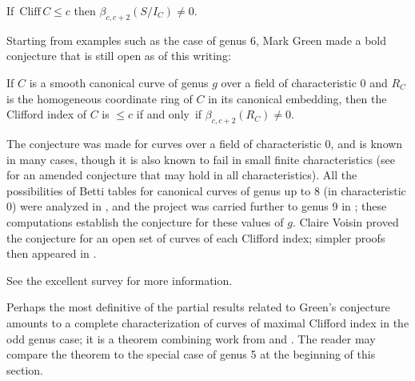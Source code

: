 \begin{corollary}
If\, $\mathrm{Cliff}\, C \leq c$ then $\beta_{c,c+2}(S/I_C) \neq 0$.
\unif
\end{corollary}

Starting from examples such as the case of genus 6, Mark Green made a
%
bold conjecture that is still open as of this writing:

\begin{conjecture}
If $C$ is a smooth canonical curve of genus $g$ over a field of 
characteristic 0
 and $R_{C}$ is the
%
homogeneous coordinate ring of $C$ in its canonical embedding,
then the Clifford index of $C$ is $\leq c$ if and only~if
$\beta_{c,c+2}(R_{C}) \neq 0$.
\unif
\end{conjecture}

The conjecture was made for curves over a field of characteristic 0, and
is known in many cases, though it is also known to fail in small finite
characteristics (see \cite{Bopp-Schreyer} for an amended conjecture that
may hold in all characteristics).
All the possibilities of Betti tables for
canonical curves of genus up to 8 (in characteristic 0) were
analyzed
in \cite{Schreyer-canonical},
and the project was carried further to
genus 9 in \cite{Sagraloff}; 
these computations
establish the conjecture for these values of $g$.
Claire Voisin
\citeyear{MR1941089,MR2157134} 
%
proved
the conjecture 
for an open set of curves of each Clifford index; 
simpler proofs then appeared in
\cite{MR4022070,MR4213770,arXiv:2205.00266}.

See the excellent survey \cite{Farkas-progress-on-syzygies}
for more information.

Perhaps the most definitive of the 
partial results related to Green's conjecture
amounts to a complete characterization of curves
of maximal Clifford index in the odd genus case; it 
is a theorem combining work from \cite{MR1603255} and \cite{MR2157134}.
The reader may compare the theorem to the special case of genus 5 at the 
beginning of this section.

